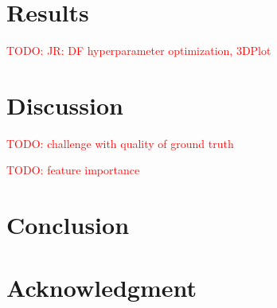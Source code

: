 \documentclass[journal]{IEEEtran}
\newcommand\TODO[1]{\textcolor{red}{TODO: #1}}
\begin{document}
\section{Results}
\TODO{JR: DF hyperparameter optimization, 3DPlot}

\section{Discussion}
\TODO{challenge with quality of ground truth}

\TODO{feature importance}


\section{Conclusion}

\section*{Acknowledgment}



\end{document}
